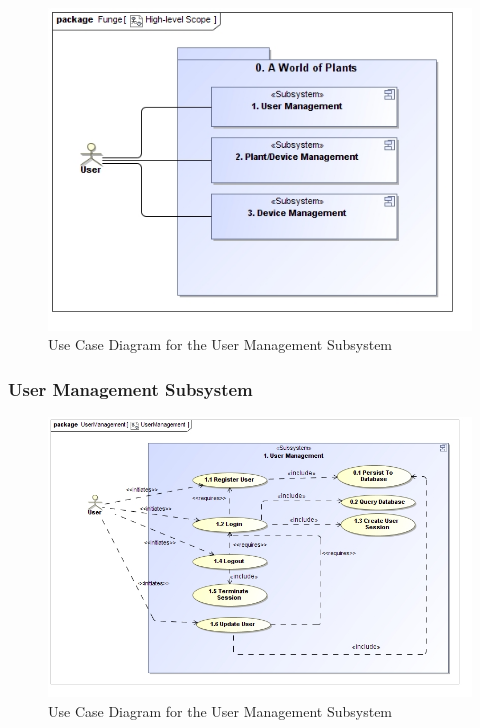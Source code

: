 \documentclass{article}
\begin{document}
\begin{figure}[H]
	\includegraphics[width=\linewidth]{images/UseCases/High-level Scope.jpg}
	\caption{Use Case Diagram for the User Management Subsystem}
\end{figure}

\subsubsection{User Management Subsystem}

	\begin{figure}[H]
		\includegraphics[width=\linewidth]{images/UseCases/UserManagement.jpg}
		\caption{Use Case Diagram for the User Management Subsystem}
	\end{figure}
\end{document}
